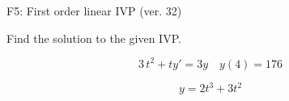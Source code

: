 \begin{exercise}
  \begin{exerciseTitle}F5: First order linear IVP (ver. 32)\end{exerciseTitle}
  \begin{exerciseStatement}
    
Find the solution to the given IVP.

    
\[3 \, t^{2} +ty'= 3 y \hspace{1em} y( 4 ) = 176\]

  \end{exerciseStatement}
  \begin{exerciseAnswer}
    
\[y= 2 t^ 3 +3 t^{2}\]

  \end{exerciseAnswer}
\end{exercise}